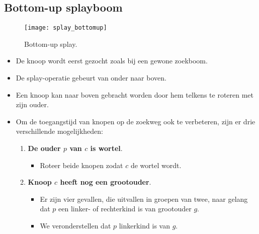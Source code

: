 \subsection{Bottom-up splayboom}
\begin{figure}[ht]
    \centering
    \texttt{[image: splay\_bottomup]}
    \caption{Bottom-up splay.}
    \label{fig:splay_bottomup}
\end{figure}
\begin{itemize}
    \item De knoop wordt eerst gezocht zoals bij een gewone zoekboom.
    \item De splay-operatie gebeurt van onder naar boven.
    \item Een knoop kan naar boven gebracht worden door hem telkens te roteren met zijn ouder.
    \item Om de toegangstijd van knopen op de zoekweg ook te verbeteren, zijn er drie verschillende mogelijkheden:
    \begin{enumerate}
        \item \textbf{De ouder $p$ van $c$ is wortel}. 
        \begin{itemize}
            \item Roteer beide knopen zodat $c$ de wortel wordt.
        \end{itemize}
        \item \textbf{Knoop $c$ heeft nog een grootouder}.
        \begin{itemize}
            \item Er zijn vier gevallen, die uitvallen in groepen van twee, naar gelang dat $p$ een linker- of rechterkind is van grootouder $g$.
            \item We veronderstellen dat $p$ linkerkind is van $g$.
        \end{itemize}
        

\end{enumerate}
\end{itemize}
